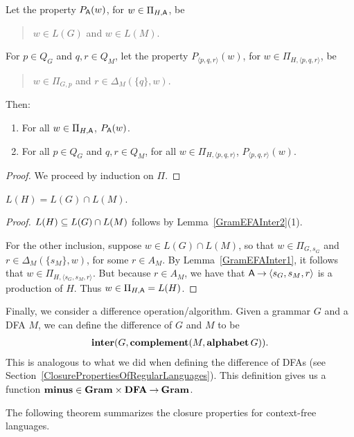 \begin{lemma}
\label{GramEFAInter2}
Let the property $P_{\mathsf{A}}(w)$, for $w\in\Pi_{H,\mathsf{A}}$, be
\begin{quotation}
\noindent
$w\in L(G)$ and $w\in L(M)$.  
\end{quotation}
For $p\in Q_G$ and $q,r\in Q_M$,
let the property $P_{\langle p,q,r\rangle}(w)$, for
$w\in\Pi_{H,\langle p,q,r\rangle}$, be
\begin{quotation}
\noindent
$w\in\Pi_{G,p}$ and $r\in\Delta_M(\{q\},w)$.
\end{quotation}
Then:
\begin{enumerate}[(1)]
\item For all $w\in\Pi_{H,\mathsf{A}}$, $P_{\mathsf{A}}(w)$.

\item For all $p\in Q_G$ and $q,r\in Q_M$, for all
$w\in\Pi_{H,\langle p,q,r\rangle}$, $P_{\langle p,q,r\rangle}(w)$.
\end{enumerate}
\end{lemma}

\begin{proof}
We proceed by induction on $\Pi$.
\end{proof}

\begin{lemma}
$L(H) = L(G)\cap L(M)$.
\end{lemma}

\begin{proof}
$L(H) \subseteq L(G)\cap L(M)$ follows by Lemma~\ref{GramEFAInter2}(1).

For the other inclusion, suppose $w\in L(G)\cap L(M)$, so that
$w\in\Pi_{G,s_G}$ and $r\in\Delta_M(\{s_M\},w)$, for some $r\in A_M$. By
Lemma~\ref{GramEFAInter1}, it follows that
$w\in\Pi_{H,\langle s_G, s_M, r\rangle}$. But because $r\in A_M$, we
have that $\mathsf{A}\mathbin{\to}\langle s_G, s_M, r\rangle$ is a production of $H$.
Thus $w\in\Pi_{H,\mathsf{A}}=L(H)$.
\end{proof}

Finally, we consider a difference operation/algorithm.
Given a grammar $G$ and a DFA $M$, we can define the difference of
$G$ and $M$ to be
\begin{gather*}
\mathbf{inter}(G, \mathbf{complement}(M, \mathbf{alphabet}\,G)) .
\end{gather*}
This is analogous to what we did when defining the difference of
DFAs (see Section~\ref{ClosurePropertiesOfRegularLanguages}).
This definition gives us a function
$\mathbf{minus}\in\mathbf{Gram}\times\mathbf{DFA}\mathbin{\to}\mathbf{Gram}$.

The following theorem summarizes the closure properties for context-free
languages.

